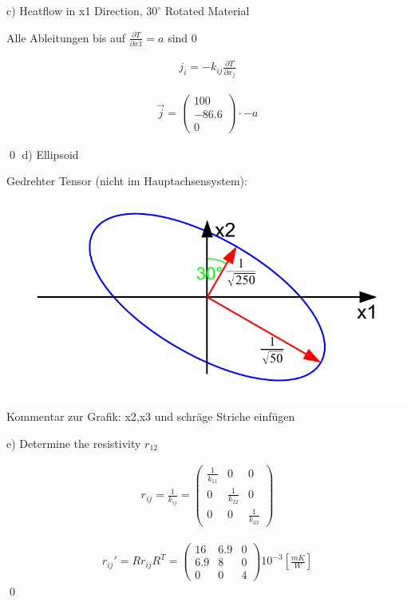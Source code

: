 c) Heatflow in x1 Direction, $30^\circ$ Rotated Material

Alle Ableitungen bis auf $\frac{\partial T}{\partial x1}=a$ sind 0


\begin{align}
j_i=-k_{ij} \frac{\partial T}{\partial x_j}
\end{align}

\begin{align}
\vec{j}=\begin{pmatrix}
100 \\
-86.6 \\
0
\end{pmatrix}
\cdot -a
\end{align}

\qed
d) Ellipsoid

\begin{center}
	Gedrehter Tensor (nicht im Hauptachsensystem):\\
	\includegraphics[scale=0.8]{images/quadrik_2d_ellipse_uebung_rotation.pdf}\\
	Kommentar zur Grafik: x2,x3 und schräge Striche einfügen\\
\end{center}

e) Determine the resistivity $r_{12}$

\begin{align}
r_{ij}=\frac{1}{k_{ij}}=\begin{pmatrix}
\frac{1}{k_{11}} & 0 & 0 \\
0 & \frac{1}{k_{22}} & 0 \\
0 & 0 & \frac{1}{k_{33}}
\end{pmatrix}
\end{align}

\begin{align}
r_{ij}'=Rr_{ij}R^{T} = \begin{pmatrix}
16 & 6.9 & 0 \\
6.9 & 8 & 0 \\
0 & 0 & 4
\end{pmatrix}
10^{-3}[\frac{mK}{W}] 
\end{align}
\qed




